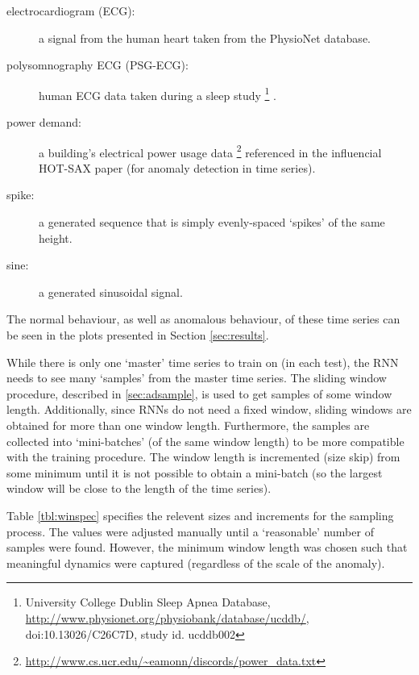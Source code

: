 \begin{description}

\item[electrocardiogram  (ECG):] a signal from the human heart taken from the PhysioNet \cite{PhysioNet} database.

\item[polysomnography ECG (PSG-ECG):] human ECG data \cite{PhysioNet} taken during a sleep study%
\footnote{University College Dublin Sleep Apnea Database, \url{http://www.physionet.org/physiobank/database/ucddb/}, doi:10.13026/C26C7D, study id. ucddb002}%
.

\item[power demand:] a building's electrical power usage data
\footnote{\url{http://www.cs.ucr.edu/~eamonn/discords/power_data.txt}} referenced in the influencial HOT-SAX paper \cite{Keogh2005} (for anomaly detection in time series).

\item[spike:] a generated sequence that is simply evenly-spaced `spikes' of the same height.

\item[sine:] a generated sinusoidal signal.

\end{description}
\noindent
%
The normal behaviour, as well as anomalous behaviour, of these time series can be seen in the plots presented in Section \ref{sec:results}.

While there is only one `master' time series to train on (in each test), the RNN needs to see many `samples' from the master time series.
%
The sliding window procedure, described in \ref{sec:adsample}, is used to get samples of some window length.
%
Additionally, since RNNs do not need a fixed window, sliding windows are obtained for more than one window length.
%
Furthermore, the samples are collected into `mini-batches' (of the same window length) to be more compatible with the training procedure.
%
The window length is incremented (size skip) from some minimum until it is not possible to obtain a mini-batch (so the largest window will be close to the length of the time series).


Table \ref{tbl:winspec} specifies the relevent sizes and increments for the sampling process.
%
The values were adjusted manually until a `reasonable' number of samples were found.
%
However, the minimum window length was chosen such that meaningful dynamics were captured (regardless of the scale of the anomaly).

